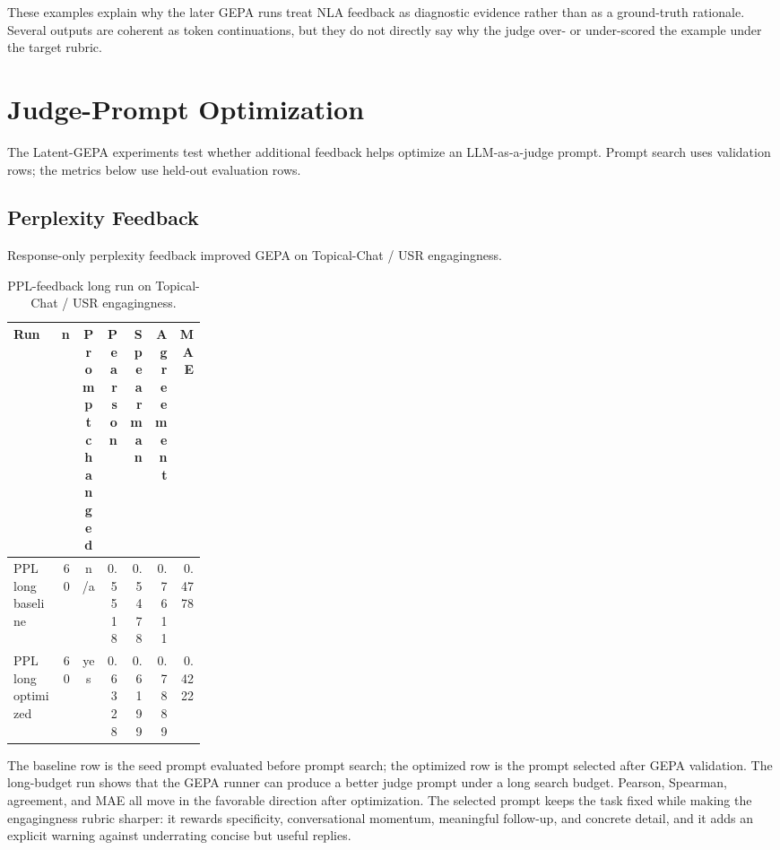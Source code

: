 \documentclass[12pt,a4paper,twoside,openright]{book}
\begin{document}
These examples explain why the later GEPA runs treat NLA feedback as diagnostic
evidence rather than as a ground-truth rationale. Several outputs are coherent as
token continuations, but they do not directly say why the judge over- or
under-scored the example under the target rubric.

\section{Judge-Prompt Optimization}
\label{sec:results-gepa}

The Latent-GEPA experiments test whether additional feedback helps optimize an
LLM-as-a-judge prompt. Prompt search uses validation rows; the metrics below use
held-out evaluation rows.

\subsection{Perplexity Feedback}
\label{subsec:results-gepa-ppl}

Response-only perplexity feedback improved GEPA on Topical-Chat / USR
engagingness.

\begin{table}[!htb]
    \centering
    \scriptsize
    \begin{adjustbox}{width=\textwidth}
    \begin{tabular}{p{0.25\linewidth} r c r r r r}
        \toprule
        \textbf{Run} & \textbf{n} & \textbf{Prompt changed} & \textbf{Pearson} & \textbf{Spearman} & \textbf{Agreement} & \textbf{MAE} \\
        \midrule
        PPL long baseline &
        60 & n/a & 0.5518 & 0.5478 & 0.7611 & 0.4778 \\
        PPL long optimized &
        60 & yes & 0.6328 & 0.6199 & 0.7889 & 0.4222 \\
        \bottomrule
    \end{tabular}
    \end{adjustbox}
    \caption{PPL-feedback long run on Topical-Chat / USR engagingness.}
    \label{tab:gepa-ppl-long}
\end{table}

The baseline row is the seed prompt evaluated before prompt search; the
optimized row is the prompt selected after GEPA validation. The long-budget run
shows that the GEPA runner can produce a better judge prompt under a long search
budget. Pearson, Spearman, agreement, and MAE all move in the favorable
direction after optimization. The selected prompt keeps the task fixed while
making the engagingness rubric sharper: it rewards specificity, conversational
momentum, meaningful follow-up, and concrete detail, and it adds an explicit
warning against underrating concise but useful replies.
\end{document}
